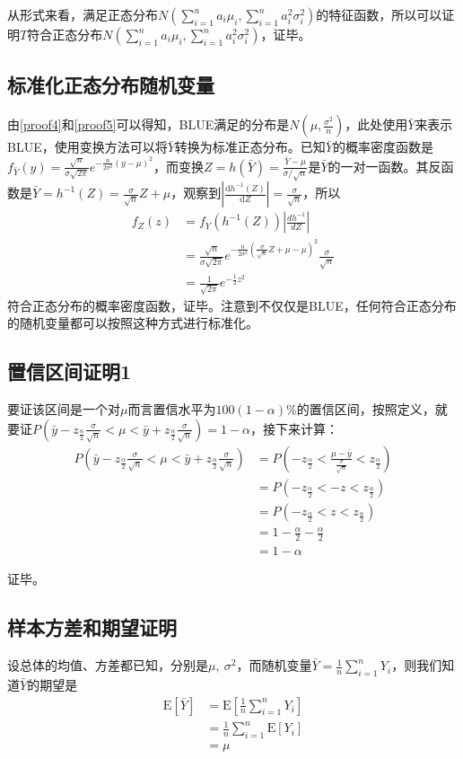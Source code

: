 \documentclass[UTF8]{ctexbook}
\begin{document}
从形式来看，满足正态分布$N(\sum_{i=1}^na_i\mu_i, \sum_{i=1}^na_i^2\sigma_i^2)$的特征函数，所以可以证明$T$符合正态分布$N(\sum_{i=1}^na_i\mu_i, \sum_{i=1}^na_i^2\sigma_i^2)$，证毕。

\subsection{标准化正态分布随机变量}
\label{proof6}
由\ref{proof4}和\ref{proof5}可以得知，BLUE满足的分布是$N(\mu, \frac{\sigma^2}{n})$，此处使用$\bar Y$来表示BLUE，使用变换方法可以将$\bar Y$转换为标准正态分布。已知$\bar Y$的概率密度函数是$f_{\bar Y}(y)=\frac{\sqrt{n}}{\sigma\sqrt{2\pi}}e^{-\frac{n}{2\sigma^2}(y-\mu)^2}$，而变换$Z=h(\bar Y)=\frac{\bar Y-\mu}{\sigma/\sqrt{n}}$是$\bar Y$的一对一函数。其反函数是$\bar Y=h^{-1}(Z)=\frac{\sigma}{\sqrt n}Z+\mu$，观察到$\left|\frac{\mathrm dh^{-1}(Z)}{\mathrm dZ}\right|=\frac{\sigma}{\sqrt n}$，所以
\begin{align*}
	f_Z(z)&=f_Y(h^{-1}(Z))\left|\frac{dh^{-1}}{dZ}\right|\\
	&=\frac{\sqrt{n}}{\sigma\sqrt{2\pi}}e^{-\frac{n}{2\sigma^2}(\frac{\sigma}{\sqrt n}Z+\mu-\mu)^2}\frac{\sigma}{\sqrt n}\\
	&=\frac{1}{\sqrt{2\pi}}e^{-\frac{1}{2}z^2}
\end{align*}
符合正态分布的概率密度函数，证毕。注意到不仅仅是BLUE，任何符合正态分布的随机变量都可以按照这种方式进行标准化。
\subsection{置信区间证明1}
\label{proof7}
要证该区间是一个对$\mu$而言置信水平为$100(1-\alpha)\%$的置信区间，按照定义，就要证$P(\bar y-z_{\frac{\alpha}{2}}\frac{\sigma}{\sqrt n}<\mu<\bar y+z_{\frac{\alpha}{2}}\frac{\sigma}{\sqrt n})=1-\alpha$，接下来计算：
\begin{align*}
	P(\bar y-z_{\frac{\alpha}{2}}\frac{\sigma}{\sqrt n}<\mu<\bar y+z_{\frac{\alpha}{2}}\frac{\sigma}{\sqrt n})&=P(-z_\frac{\alpha}{2}<\frac{\mu-\bar y}{\frac{\sigma}{\sqrt n}}<z_\frac{\alpha}{2})\\
	&=P(-z_\frac{\alpha}{2}<-z<z_\frac{\alpha}{2})\\
	&=P(-z_\frac{\alpha}{2}<z<z_\frac{\alpha}{2})\\
	&=1-\frac{\alpha}{2}-\frac{\alpha}{2}\\
	&=1-\alpha
\end{align*}

证毕。

\subsection{样本方差和期望证明}
\label{proof8}
设总体的均值、方差都已知，分别是$\mu,\ \sigma^2$，而随机变量$\bar Y=\frac{1}{n}\sum_{i=1}^nY_i$，则我们知道$\bar Y$的期望是
\begin{align*}
	\mathrm E[\bar Y]&=\mathrm E[\frac{1}{n}\sum_{i=1}^nY_i]\\
	&=\frac{1}{n}\sum_{i=1}^n\mathrm E[Y_i]\\
	&=\mu
\end{align*}
\end{document}
